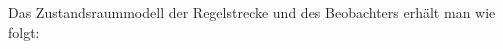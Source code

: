 \documentclass[11pt]{scrartcl} %
\begin{document}
Das Zustandsraummodell der Regelstrecke und des Beobachters erhält man wie folgt:
\end{document}
